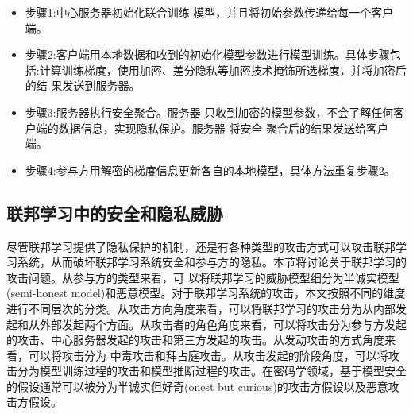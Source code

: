 \begin{itemize}
\item 步骤1:中心服务器初始化联合训练 模型，并且将初始参数传递给每一个客户端。
\item 步骤2:客户端用本地数据和收到的初始化模型参数进行模型训练。具体步骤包括:计算训练梯度，使用加密、差分隐私等加密技术掩饰所选梯度，并将加密后的结 果发送到服务器。
\item 步骤3:服务器执行安全聚合。服务器 只收到加密的模型参数，不会了解任何客 户端的数据信息，实现隐私保护。服务器 将安全 聚合后的结果发送给客户端。
\item 步骤4:参与方用解密的梯度信息更新各自的本地模型，具体方法重复步骤2。
\end{itemize}

\subsection{联邦学习中的安全和隐私威胁}
尽管联邦学习提供了隐私保护的机制，还是有各种类型的攻击方式可以攻击联邦学习系统，从而破坏联邦学习系统安全和参与方的隐私。本节将讨论关于联邦学习的攻击问题。从参与方的类型来看，可 以将联邦学习的威胁模型细分为半诚实模型 (semi-honest model)和恶意模型。对于联邦学习系统的攻击，本文按照不同的维度进行不同层次的分类。从攻击方向角度来看，可以将联邦学习的攻击分为从内部发起和从外部发起两个方面。从攻击者的角色角度来看，可以将攻击分为参与方发起的攻击、中心服务器发起的攻击和第三方发起的攻击。从发动攻击的方式角度来看，可以将攻击分为 中毒攻击和拜占庭攻击。从攻击发起的阶段角度，可以将攻击分为模型训练过程的攻击和模型推断过程的攻击。在密码学领域，基于模型安全的假设通常可以被分为半诚实但好奇(onest but curious)的攻击方假设以及恶意攻击方假设。

